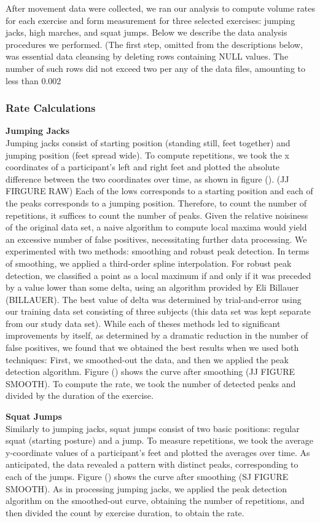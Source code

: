 After movement data were collected, we ran our analysis to compute volume rates for each exercise and form measurement for three selected exercises: jumping jacks, high marches, and squat jumps. Below we describe the data analysis procedures we performed. (The first step, omitted from the descriptions below, was essential data cleansing by deleting rows containing NULL values. The number of such rows did not exceed two per any of the data files, amounting to less than 0.002%

\subsubsection{Rate Calculations}
\textbf{Jumping Jacks}  \\
Jumping jacks consist of starting position (standing still, feet together) and jumping position (feet spread wide). To compute repetitions, we took the x coordinates of a participant’s left and right feet and plotted the absolute difference between the two coordinates over time, as shown in figure (). (JJ FIRGURE RAW) Each of the lows corresponds to a starting position and each of the peaks corresponds to a jumping position. Therefore, to count the number of repetitions, it suffices to count the number of peaks. Given the relative noisiness of the original data set, a naive algorithm to compute local maxima would yield an excessive number of false positives, necessitating further data processing. We experimented with two methods: smoothing and robust peak detection. In terms of smoothing, we applied a third-order spline interpolation. For robust peak detection, we classified a point as a local maximum if and only if it was preceded by a value lower than some delta, using an algorithm provided by Eli Billauer (BILLAUER). The best value of delta was determined by trial-and-error using our training data set consisting of three subjects (this data set was kept separate from our study data set). While each of theses methods led to significant improvements by itself, as determined by a dramatic reduction in the number of false positives, we found that we obtained the best results when we used both techniques: First, we smoothed-out the data, and then we applied the peak detection algorithm. Figure () shows the curve after smoothing (JJ FIGURE SMOOTH). To compute the rate, we took the number of detected peaks and divided by the duration of the exercise.

\textbf{Squat Jumps}  \\
Similarly to jumping jacks, squat jumps consist of two basic positions: regular squat (starting posture) and a jump. To measure repetitions, we took the average y-coordinate values of a participant's feet and plotted the averages over time. As anticipated, the data revealed a pattern with distinct peaks, corresponding to each of the jumps. Figure () shows the curve after smoothing (SJ FIGURE SMOOTH). As in processing jumping jacks, we applied the peak detection algorithm on the smoothed-out curve, obtaining the number of repetitions, and then divided the count by exercise duration, to obtain the rate.

